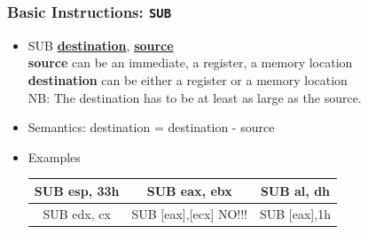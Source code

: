 \documentclass[]{beamer}
\begin{document}
\begin{frame}
  \frametitle{Basic Instructions: {\tt SUB}}
  \begin{itemize}
  \item{SUB \underline{\textbf{destination}}, \underline{\textbf{source}}}\\
    \textbf{source} can be an immediate, a register, a memory location\\
    \textbf{destination} can be either a register or a memory location\\
    NB: The destination has to be at least as large as the source.
  \item{Semantics: destination = destination - source}

  \item{Examples}
    \begin{table}[h]
      \begin{tabular}{|c|c|c|}
        \hline
        SUB esp, 33h&SUB eax, ebx&SUB al, dh\\
        \hline
        SUB edx, cx&SUB [eax],[ecx] \color{red}NO!!!&SUB [eax],1h\\
        \hline
      \end{tabular}
    \end{table}

  \end{itemize}
\end{frame}
\end{document}
